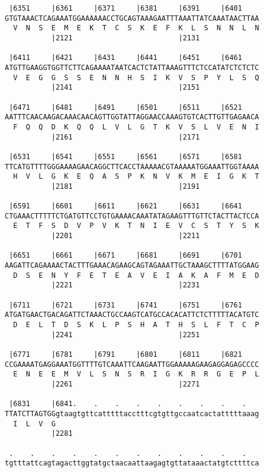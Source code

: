 \documentclass{article}
\begin{document}
\begin{Verbatim}
 |6351     |6361     |6371     |6381     |6391     |6401    
GTGTAAACTCAGAAATGGAAAAAACCTGCAGTAAAGAATTTAAATTATCAAATAACTTAA
  V  N  S  E  M  E  K  T  C  S  K  E  F  K  L  S  N  N  L  N
           |2121                         |2131              
  
 |6411     |6421     |6431     |6441     |6451     |6461    
ATGTTGAAGGTGGTTCTTCAGAAAATAATCACTCTATTAAAGTTTCTCCATATCTCTCTC
  V  E  G  G  S  S  E  N  N  H  S  I  K  V  S  P  Y  L  S  Q
           |2141                         |2151              
  
 |6471     |6481     |6491     |6501     |6511     |6521    
AATTTCAACAAGACAAACAACAGTTGGTATTAGGAACCAAAGTGTCACTTGTTGAGAACA
  F  Q  Q  D  K  Q  Q  L  V  L  G  T  K  V  S  L  V  E  N  I
           |2161                         |2171              
  
 |6531     |6541     |6551     |6561     |6571     |6581    
TTCATGTTTTGGGAAAAGAACAGGCTTCACCTAAAAACGTAAAAATGGAAATTGGTAAAA
  H  V  L  G  K  E  Q  A  S  P  K  N  V  K  M  E  I  G  K  T
           |2181                         |2191              
  
 |6591     |6601     |6611     |6621     |6631     |6641    
CTGAAACTTTTTCTGATGTTCCTGTGAAAACAAATATAGAAGTTTGTTCTACTTACTCCA
  E  T  F  S  D  V  P  V  K  T  N  I  E  V  C  S  T  Y  S  K
           |2201                         |2211              
  
 |6651     |6661     |6671     |6681     |6691     |6701    
AAGATTCAGAAAACTACTTTGAAACAGAAGCAGTAGAAATTGCTAAAGCTTTTATGGAAG
  D  S  E  N  Y  F  E  T  E  A  V  E  I  A  K  A  F  M  E  D
           |2221                         |2231              
  
 |6711     |6721     |6731     |6741     |6751     |6761    
ATGATGAACTGACAGATTCTAAACTGCCAAGTCATGCCACACATTCTCTTTTTACATGTC
  D  E  L  T  D  S  K  L  P  S  H  A  T  H  S  L  F  T  C  P
           |2241                         |2251              
  
 |6771     |6781     |6791     |6801     |6811     |6821    
CCGAAAATGAGGAAATGGTTTTGTCAAATTCAAGAATTGGAAAAAGAAGAGGAGAGCCCC
  E  N  E  E  M  V  L  S  N  S  R  I  G  K  R  R  G  E  P  L
           |2261                         |2271              
  
 |6831     |6841.    .    .    .    .    .    .    .    .   
TTATCTTAGTGGgtaagtgttcatttttacctttcgtgttgccaatcactatttttaaag
  I  L  V  G                                                
           |2281                                            
  
 .    .    .    .    .    .    .    .    .    .    .    .   
tgtttattcagtagacttggtatgctaacaattaagagtgttataaactatgtcttttca
                                                            

\end{Verbatim}
\end{document}
